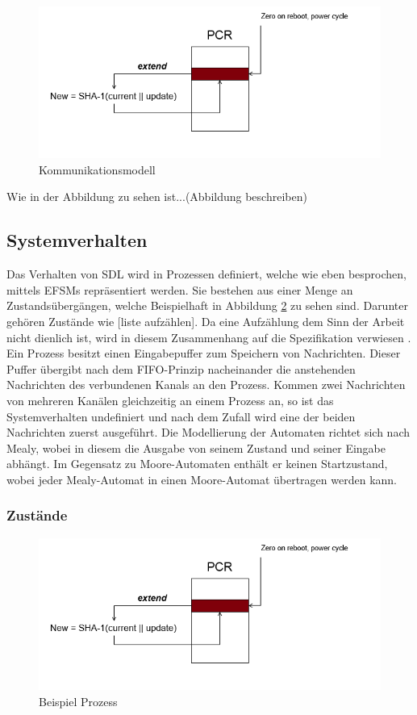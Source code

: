 \begin{figure}[ht]
	\centering
	\includegraphics[width=1\textwidth]{test.png}
	\caption{Kommunikationsmodell}
	\label{fig:KommModell}
\end{figure}

Wie in der Abbildung zu sehen ist...(Abbildung beschreiben)


\subsection{Systemverhalten}
\label{ssc:Verhalten}
Das Verhalten von \ac{SDL} wird in Prozessen definiert, welche wie eben besprochen, mittels \ac{EFSM}s repräsentiert werden. Sie bestehen aus einer Menge an Zustandsübergängen, welche Beispielhaft in Abbildung \ref{fig:BspProzess} zu sehen sind. Darunter gehören Zustände wie [liste aufzählen]. Da eine Aufzählung dem Sinn der Arbeit nicht dienlich ist, wird in diesem Zusammenhang auf die Spezifikation verwiesen \cite{ITU18}.
Ein Prozess besitzt einen Eingabepuffer zum Speichern von Nachrichten. Dieser Puffer übergibt nach dem \ac{FIFO}-Prinzip nacheinander die anstehenden Nachrichten des verbundenen Kanals an den Prozess. Kommen zwei Nachrichten von mehreren Kanälen gleichzeitig an einem Prozess an, so ist das Systemverhalten undefiniert und nach dem Zufall wird eine der beiden Nachrichten zuerst ausgeführt.
Die Modellierung der Automaten richtet sich nach Mealy, wobei in diesem die Ausgabe von seinem Zustand und seiner Eingabe abhängt.
Im Gegensatz zu Moore-Automaten enthält er keinen Startzustand, wobei jeder Mealy-Automat in einen Moore-Automat übertragen werden kann.


\subsubsection{Zustände}
\label{sssc:Verhalten}

\begin{figure}[ht]
	\centering
	\includegraphics[width=1\textwidth]{test.png}
	\caption{Beispiel Prozess}
	\label{fig:BspProzess}
\end{figure}

